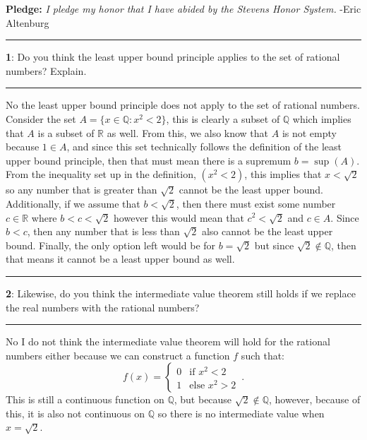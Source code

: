 \documentclass[11pt]{article}
\newcommand\question[2]{\vspace{.25in}\hrule\textbf{#1}: #2\vspace{.5em}\hrule\vspace{.10in}}
\newcommand{\R}{\mathbb{R}}
\newcommand{\Q}{\mathbb{Q}}
\begin{document}
\raggedright
\newcommand\NAME{Eric Altenburg}  %
\newcommand\COURSE{MA-240}
\newcommand\HWNUM{19}              %


\textbf{Pledge:} \textit{I pledge my honor that I have abided by the Stevens Honor System.} -Eric Altenburg

\question{1}{Do you think the least upper bound principle applies to the set of rational numbers? Explain.}
No the least upper bound principle does not apply to the set of rational numbers. Consider the set $A = \{x \in \Q : x^2 < 2\}$, this is clearly a subset of $\Q$ which implies that $A$ is a subset of $\R$ as well. From this, we also know that $A$ is not empty because $1 \in A$, and since this set technically follows the definition of the least upper bound principle, then that must mean there is a supremum $b = \sup(A)$. From the inequality set up in the definition, $(x^2 < 2)$, this implies that $x < \sqrt{2}$ so any number that is greater than $\sqrt{2}$ cannot be the least upper bound. Additionally, if we assume that $b < \sqrt{2}$, then there must exist some number $c \in \R$ where $b < c < \sqrt{2}$ however this would mean that $c^2 < \sqrt{2}$ and $c \in A$. Since $b < c$, then any number that is less than $\sqrt{2}$ also cannot be the least upper bound. Finally, the only option left would be for $b=\sqrt{2}$ but since $\sqrt{2} \not \in \Q$, then that means it cannot be a least upper bound as well.

\question{2}{Likewise, do you think the intermediate value theorem still holds if we replace the real numbers with the rational numbers?}

No I do not think the intermediate value theorem will hold for the rational numbers either because we can construct a function $f$ such that:
	\begin{equation*}
		f(x) = 
		\begin{cases}
			0 & \text{if $x^2 < 2$}\\
			1 & \text{else $x^2 > 2$}
		\end{cases}\,.
	\end{equation*}
	This is still a continuous function on $\Q$, but because $\sqrt{2} \not \in \Q$, however, because of this, it is also not continuous on $\Q$ so there is no intermediate value when $x=\sqrt{2}$.
\end{document}
